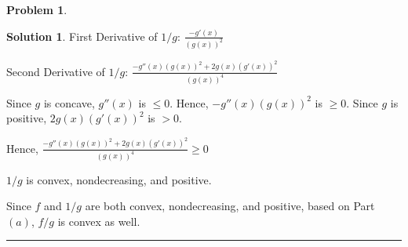 \documentclass{article}
\theoremstyle{definition}
\newtheorem{problem}{Problem}
\def\fline{\rule{0.75\linewidth}{0.5pt}}
\newcommand{\finishline}{\begin{center}\fline\end{center}}
\newtheorem*{solution*}{Solution}
\newenvironment{solution}{\begin{solution*}}{{\finishline} \end{solution*}}
\begin{document}
\begin{problem}
\begin{itemize}
\begin{solution}
            First Derivative of $1/g$: $\frac{-g'(x)}{(g(x))^2}$ \newline 

            Second Derivative of $1/g$: $\frac{-g''(x)(g(x))^2 + 2g(x) (g'(x))^2}{(g(x))^4}$ \newline 

            Since $g$ is concave, $g''(x)$ is $\leq 0$. Hence, $-g''(x)(g(x))^2$ is $\geq 0$. Since $g$ is positive, $2g(x) (g'(x))^2$ is $> 0$. 

            Hence, $\frac{-g''(x)(g(x))^2 + 2g(x) (g'(x))^2}{(g(x))^4} \geq 0$

            $1/g$ is convex, nondecreasing, and positive. \newline 

            Since $f$ and $1/g$ are both convex, nondecreasing, and positive, based on Part $(a)$, $f/g$ is convex as well. 

        \end{solution}
    \end{itemize}
\end{problem}
\end{document}
